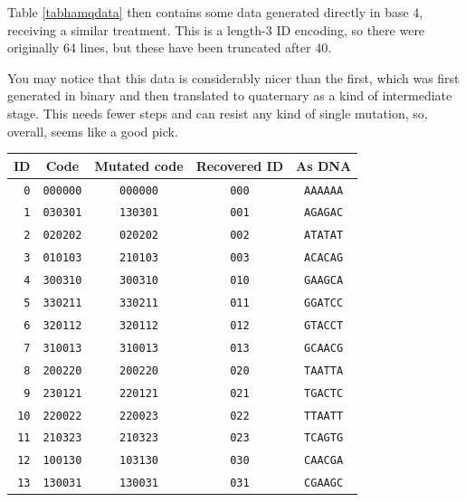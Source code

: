 \documentclass[a4paper,11pt]{article}
\begin{document}
    Table \ref{tabhamqdata} then contains some data generated directly in base
    4, receiving a similar treatment. This is a length-3 ID encoding, so there
    were originally 64 lines, but these have been truncated after 40.

    You may notice that this data is considerably nicer than the first,
    which was first generated in binary and then translated to quaternary as a
    kind of intermediate stage. This needs fewer steps and can resist any kind
    of single mutation, so, overall, seems like a good pick.

\begin{table}[H]
\begin{center}
\begin{tabular}{rcccc} \toprule
ID & Code & Mutated code & Recovered ID & As DNA \\ \midrule
\texttt{0} & \texttt{000000} & \texttt{000000} & \texttt{000} & \texttt{AAAAAA} \\
\texttt{1} & \texttt{030301} & \texttt{130301} & \texttt{001} & \texttt{AGAGAC} \\
\texttt{2} & \texttt{020202} & \texttt{020202} & \texttt{002} & \texttt{ATATAT} \\
\texttt{3} & \texttt{010103} & \texttt{210103} & \texttt{003} & \texttt{ACACAG} \\
\texttt{4} & \texttt{300310} & \texttt{300310} & \texttt{010} & \texttt{GAAGCA} \\
\texttt{5} & \texttt{330211} & \texttt{330211} & \texttt{011} & \texttt{GGATCC} \\
\texttt{6} & \texttt{320112} & \texttt{320112} & \texttt{012} & \texttt{GTACCT} \\
\texttt{7} & \texttt{310013} & \texttt{310013} & \texttt{013} & \texttt{GCAACG} \\
\texttt{8} & \texttt{200220} & \texttt{200220} & \texttt{020} & \texttt{TAATTA} \\
\texttt{9} & \texttt{230121} & \texttt{220121} & \texttt{021} & \texttt{TGACTC} \\
\texttt{10} & \texttt{220022} & \texttt{220023} & \texttt{022} & \texttt{TTAATT} \\
\texttt{11} & \texttt{210323} & \texttt{210323} & \texttt{023} & \texttt{TCAGTG} \\
\texttt{12} & \texttt{100130} & \texttt{103130} & \texttt{030} & \texttt{CAACGA} \\
\texttt{13} & \texttt{130031} & \texttt{130031} & \texttt{031} & \texttt{CGAAGC} \\

\end{tabular}
\end{center}
\end{table}
\end{document}
